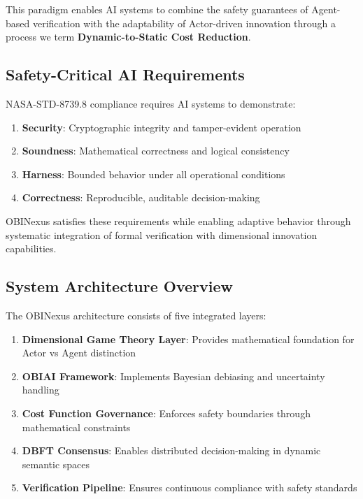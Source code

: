 \documentclass[12pt,a4paper]{article}
\begin{document}
This paradigm enables AI systems to combine the safety guarantees of Agent-based verification with the adaptability of Actor-driven innovation through a process we term \textbf{Dynamic-to-Static Cost Reduction}.

\subsection{Safety-Critical AI Requirements}

NASA-STD-8739.8 compliance requires AI systems to demonstrate:

\begin{enumerate}
    \item \textbf{Security}: Cryptographic integrity and tamper-evident operation
    \item \textbf{Soundness}: Mathematical correctness and logical consistency
    \item \textbf{Harness}: Bounded behavior under all operational conditions
    \item \textbf{Correctness}: Reproducible, auditable decision-making
\end{enumerate}

OBINexus satisfies these requirements while enabling adaptive behavior through systematic integration of formal verification with dimensional innovation capabilities.

\subsection{System Architecture Overview}

The OBINexus architecture consists of five integrated layers:

\begin{enumerate}
    \item \textbf{Dimensional Game Theory Layer}: Provides mathematical foundation for Actor vs Agent distinction
    \item \textbf{OBIAI Framework}: Implements Bayesian debiasing and uncertainty handling
    \item \textbf{Cost Function Governance}: Enforces safety boundaries through mathematical constraints
    \item \textbf{DBFT Consensus}: Enables distributed decision-making in dynamic semantic spaces
    \item \textbf{Verification Pipeline}: Ensures continuous compliance with safety standards
\end{enumerate}
\end{document}
